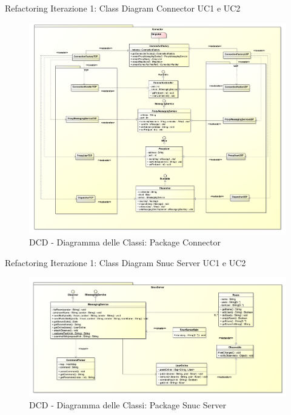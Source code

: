 \begin{frame} {Refactoring Iterazione 1: Class Diagram Connector UC1 e UC2}
   \begin{figure}
     \includegraphics[scale=0.084]{image_astah/Iteration_1_DesignModel_Refactored/ClassDiagramConnector.png}{\centering}
     \caption{DCD - Diagramma delle Classi: Package Connector }
     \label{fig_UC1_UC2_DCDR_3} 
   \end{figure}
\end{frame}

\begin{frame} {Refactoring Iterazione 1: Class Diagram Snuc Server UC1 e UC2}
   \begin{figure}
     \includegraphics[scale=0.135]{image_astah/Iteration_1_DesignModel_Refactored/ClassDiagramSnucServer.png}{\centering}
     \caption{DCD - Diagramma delle Classi: Package Snuc Server }
     \label{fig_UC1_UC2_DCDR_4} 
   \end{figure}
\end{frame}

